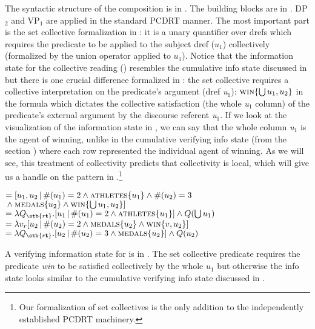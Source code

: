\documentclass[output=paper,colorlinks,citecolor=brown,newtxmath]{langscibook}
\begin{document}
The syntactic structure of the composition is in . The building blocks are in . DP$_2$ and VP$_1$ are applied in the standard PCDRT manner. The most important part is the set collective formalization in : it is a unary quantifier over drefs which requires the predicate to be applied to the subject dref ($u_1$) collectively (formalized by the union operator applied to $u_1$). Notice that the information state for the collective reading () resembles the cumulative info state discussed in  but there is one crucial difference formalized in : the set collective requires a collective interpretation on the predicate's argument (dref \textit{u$_1$}): $\textsc{win}\{\bigcup u_1,u_2\}$ in the formula which dictates the collective satisfaction (the whole \textit{u$_1$} column) of the predicate's external argument by the discourse referent \textit{u$_1$}. If we look at the visualization of the information state in , we can say that the whole column \textit{u$_1$} is the agent of winning, unlike in the cumulative verifying info state (from the section ) where each row represented the individual agent of winning. As we will see, this treatment of collectivity predicts that collectivity is local, which will give us a handle on the pattern in .\footnote{Our formalization of set collectives is the only addition to the independently established PCDRT machinery.}

\ea \label{sem:sec-set-collective}\ea\label{sem:sec-set-collective-a}
$=[u_1, u_2\,|\,\#(u_1)=2\wedge\textsc{athletes}\{u_1\} \wedge \#(u_2)=3$\\${}\wedge \textsc{medals}\{u_2\} \wedge{}\textsc{win}\{\bigcup u_1,u_2\}]$
\ex\label{sem:sec-set-collective-b}
$=\lambda Q_{\stb{r\textbf{t}}}.[u_1\,|\,\#(u_1)=2 \wedge \textsc{athletes}\{u_1\}] \wedge Q(\bigcup u_1)$
\ex
{}$=\lambda v_r[u_2\,|\,\#(u_2)=2 \wedge \textsc{medals}\{u_2\} \wedge \textsc{win}\{v,u_2\}]$
\ex
{}$=\lambda Q_{\stb{r\textbf{t}}}.[u_2\,|\,\#(u_2)=3 \wedge \textsc{medals}\{u_2\}] \wedge Q(u_2)$
\z\z

\noindent A verifying information state for  is in . The set collective predicate requires the predicate \textit{win} to be satisfied collectively by the whole $u_1$ but otherwise the info state looks similar to the cumulative verifying info state discussed in .
\end{document}
